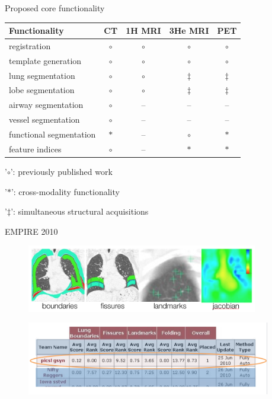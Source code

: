 \documentclass[ignorenonframetext,]{beamer}
\begin{document}
\begin{frame}{Proposed core functionality}

\begin{longtable}[c]{@{}lcccc@{}}
\toprule
\textbf{Functionality} & \textbf{CT} & \textbf{1H MRI} & \textbf{3He
MRI} & \textbf{PET}\tabularnewline
\midrule
\endhead
registration & \(\circ\) & \(\circ\) & \(\circ\) &
\(\circ\)\tabularnewline
template generation & \(\circ\) & \(\circ\) & \(\circ\) &
\(\circ\)\tabularnewline
lung segmentation & \(\circ\) & \(\circ\) & \(\ddagger\) &
\(\ddagger\)\tabularnewline
lobe segmentation & \(\circ\) & \(\circ\) & \(\ddagger\) &
\(\ddagger\)\tabularnewline
airway segmentation & \(\circ\) & -- & -- & --\tabularnewline
vessel segmentation & \(\circ\) & -- & -- & --\tabularnewline
functional segmentation & \(\ast\) & -- & \(\circ\) &
\(\ast\)\tabularnewline
feature indices & \(\circ\) & -- & \(\ast\) & \(\ast\)\tabularnewline
\bottomrule
\end{longtable}

\footnotesize

'\(\circ\)': previously published work

'\(\ast\)': cross-modality functionality

'\(\ddagger\)': simultaneous structural acquisitions

\end{frame}

\begin{frame}{EMPIRE 2010}

\centering

\begin{figure}
  \includegraphics[width=0.9\textwidth]{./competitions/figures/EMPIRE10criteria.png}
\end{figure}

\centering

\begin{figure}
  \includegraphics[width=0.95\textwidth]{./competitions/figures/EMPIRE10Results.png}
\end{figure}

\end{frame}
\end{document}

